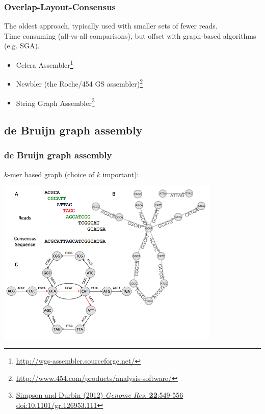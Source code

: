 \begin{frame}
  \frametitle{Overlap-Layout-Consensus}
  The oldest approach, typically used with smaller sets of fewer reads. \\[0.5cm]
  Time consuming (all-vs-all comparisons), but offset with graph-based algorithms (e.g. SGA).\\[0.5cm]
  \begin{itemize}
    \item Celera Assembler\footnote{\tiny{\href{http://wgs-assembler.sourceforge.net/}{http://wgs-assembler.sourceforge.net/}}}
    \item Newbler (the Roche/454 GS assembler)\footnote{\tiny{\href{http://www.454.com/products/analysis-software/}{http://www.454.com/products/analysis-software/}}}
    \item String Graph Assembler\footnote{\tiny{\href{http://dx.doi.org/10.1101/gr.126953.111}{Simpson and Durbin (2012) \textit{Genome Res.} \textbf{22}:549-556 doi:10.1101/gr.126953.111}}}
  \end{itemize}
\end{frame}

\subsection{de Bruijn graph assembly}

\begin{frame}
  \frametitle{de Bruijn graph assembly}
  $k$-mer based graph (choice of $k$ important):
  \begin{center}
    \includegraphics[width=0.8\textwidth]{images/deBruijn3}
  \end{center}  
\end{frame}

